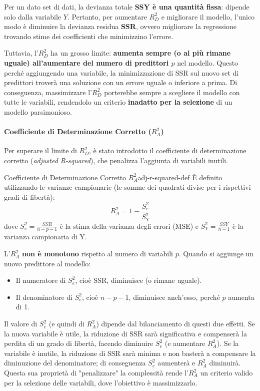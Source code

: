 Per un dato set di dati, la devianza totale \textbf{SSY è una quantità fissa}:
dipende solo dalla variabile \(Y\). Pertanto, per aumentare \(R_D^2\) e
migliorare il modello, l'unico modo è diminuire la devianza residua
\textbf{SSR}, ovvero migliorare la regressione trovando stime dei coefficienti
che minimizzino l'errore.

Tuttavia, l'\(R_D^2\) ha un grosso limite: \textbf{aumenta sempre (o al più
rimane uguale) all'aumentare del numero di predittori \(p\)} nel modello. Questo
perché aggiungendo una variabile, la minimizzazione di SSR sul nuovo set di
predittori troverà una soluzione con un errore uguale o inferiore a prima. Di
conseguenza, massimizzare l'\(R_D^2\) porterebbe sempre a scegliere il modello
con tutte le variabili, rendendolo un criterio \textbf{inadatto per la
selezione} di un modello parsimonioso.

\paragraph{Coefficiente di Determinazione Corretto (\(R^2_A\))}
Per superare il limite di \(R_D^2\), è stato introdotto il coefficiente di
determinazione corretto (\textit{adjusted R-squared}), che penalizza l'aggiunta
di variabili inutili.

\begin{definizione}{Coefficiente di Determinazione Corretto
\(R^2_A\)}{adj-r-squared-def}
È definito utilizzando le varianze campionarie (le somme dei quadrati divise
per i rispettivi gradi di libertà):
\[
    R_A^2 = 1 - \frac{S_e^2}{S_Y^2}
\]
dove \(S_e^2 = \frac{SSR}{n-p-1}\) è la stima della varianza degli errori (MSE)
e \(S_Y^2 = \frac{SSY}{n-1}\) è la varianza campionaria di Y.
\end{definizione}

L'\(R_A^2\) \textbf{non è monotono} rispetto al numero di variabili \(p\).
Quando si aggiunge un nuovo predittore al modello:
\begin{itemize}
    \item Il numeratore di \(S_e^2\), cioè SSR, diminuisce (o rimane uguale).
    \item Il denominatore di \(S_e^2\), cioè \(n-p-1\), diminuisce anch'esso,
    perché \(p\) aumenta di 1.
\end{itemize}
Il valore di \(S_e^2\) (e quindi di \(R_A^2\)) dipende dal bilanciamento di
questi due effetti. Se la nuova variabile è utile, la riduzione di SSR sarà
significativa e compenserà la perdita di un grado di libertà, facendo
diminuire \(S_e^2\) (e aumentare \(R_A^2\)). Se la variabile è inutile, la
riduzione di SSR sarà minima e non basterà a compensare la diminuzione del
denominatore; di conseguenza \(S_e^2\) aumenterà e \(R_A^2\) diminuirà.
Questa sua proprietà di "penalizzare" la complessità rende l'\(R_A^2\) un
criterio valido per la selezione delle variabili, dove l'obiettivo è
massimizzarlo.

